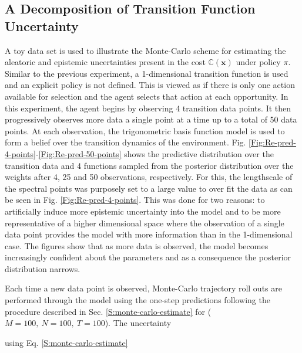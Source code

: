 \subsection{A Decomposition of Transition Function Uncertainty}
A toy data set is used to illustrate the Monte-Carlo scheme for estimating the aleatoric and epistemic uncertainties present in the cost $\mathbb{C}(\mathbf{x})$ under policy $\pi$. Similar to the previous experiment, a 1-dimensional transition function is used and an explicit policy is not defined. This is viewed as if there is only one action available for selection and the agent selects that action at each opportunity. In this experiment, the agent begins by observing 4 transition data points. It then progressively observes more data a single point at a time up to a total of 50 data points. At each observation, the trigonometric basis function model is used to form a belief over the transition dynamics of the environment. Fig. \ref{Fig:Re-pred-4-points}-\ref{Fig:Re-pred-50-points} shows the predictive distribution over the transition data and 4 functions sampled from the posterior distribution over the weights after 4, 25 and 50 observations, respectively. For this, the lengthscale of the spectral points was purposely set to a large value to over fit the data as can be seen in Fig. \ref{Fig:Re-pred-4-points}. This was done for two reasons: to artificially induce more epistemic uncertainty into the model and to be more representative of a higher dimensional space where the observation of a single data point provides the model with more information than in the 1-dimensional case. The figures show that as more data is observed, the model becomes increasingly confident about the parameters and as a consequence the posterior distribution narrows. 

Each time a new data point is observed, Monte-Carlo trajectory roll outs are performed through the model using the one-step predictions following the procedure described in Sec. \ref{S:monte-carlo-estimate} for ($M=100,\: N=100,\: T=100$). The uncertainty 

 using Eq. \ref{S:monte-carlo-estimate}



